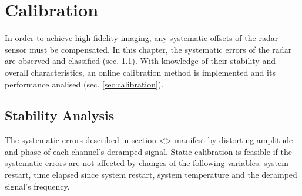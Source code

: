 \chapter{Calibration}

In order to achieve high fidelity imaging, any systematic offsets of the radar sensor must be compensated.
In this chapter, the systematic errors of the radar are observed and classified (sec. \ref{sec:stability_analysis}). With knowledge of their stability and overall characteristics,
an online calibration method is implemented and its performance analised (sec. \ref{sec:calibration}).


\section{Stability Analysis}
\label{sec:stability_analysis}
The systematic errors described in section <> manifest by distorting amplitude and phase of each channel's deramped signal.
Static calibration is feasible if the systematic errors are not affected by changes of the following variables:
system restart, time elapsed since system restart, system temperature and the deramped signal's frequency.


